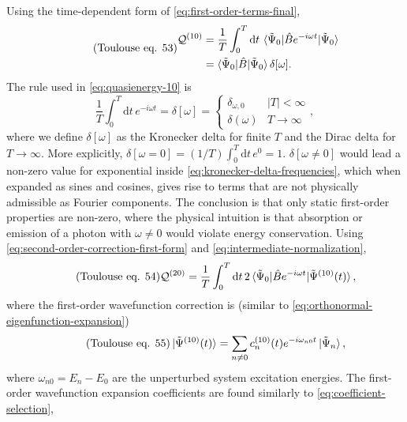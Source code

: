 \documentclass[%
class = book,%
crop = false,%
float = true,%
multi = true,%
preview = false,%
]{standalone}
\begin{document}
Using the time-dependent form of \eqref{eq:first-order-terms-final},
\begin{equation}
  \label{eq:quasienergy-10} \tag{Toulouse eq. 53}
  \begin{aligned}
    \mathcal{Q}^{(10)} &= \frac{1}{T} \int_{0}^{T} \mathrm{d}t \, \braket{\tilde{\Psi}_{0}|\hat{B}e^{-i\omega t}|\tilde{\Psi}_{0}} \\
    &= \braket{\tilde{\Psi}_{0}|\hat{B}|\tilde{\Psi}_{0}} \delta[\omega].
\end{aligned}
\end{equation}
The rule used in \eqref{eq:quasienergy-10} is
\begin{equation}
  \label{eq:kronecker-delta-frequencies}
  \frac{1}{T} \int_{0}^{T} \mathrm{d}t \, e^{-i\omega t} = \delta[\omega] =
  \begin{cases}
    \delta_{\omega,0} & |T| < \infty \\
    \delta(\omega) & T \rightarrow \infty
  \end{cases},
\end{equation}
where we define \(\delta[\omega]\) as the Kronecker delta for finite \(T\) and the Dirac delta for \(T \rightarrow \infty\). More explicitly, \(\delta[\omega = 0] = (1/T) \int_{0}^{T} \mathrm{d}t \, e^{0} = 1\). \(\delta[\omega \neq 0]\) would lead a non-zero value for exponential inside \eqref{eq:kronecker-delta-frequencies}, which when expanded as sines and cosines, gives rise to terms that are not physically admissible as Fourier components. The conclusion is that only static first-order properties are non-zero, where the physical intuition is that absorption or emission of a photon with \(\omega \neq 0\) would violate energy conservation. Using \eqref{eq:second-order-correction-first-form} and \eqref{eq:intermediate-normalization},
\begin{equation}
  \label{eq:quasienergy-20} \tag{Toulouse eq. 54}
  \mathcal{Q}^{(20)} = \frac{1}{T} \int_{0}^{T} \mathrm{d}t \, 2\braket{\tilde{\Psi}_{0}|\hat{B}e^{-i\omega t}|\tilde{\Psi}^{(10)}(t)},
\end{equation}
where the first-order wavefunction correction is (similar to \eqref{eq:orthonormal-eigenfunction-expansion})
\begin{equation}
  \label{eq:first-order-wavefunction-td} \tag{Toulouse eq. 55}
  \ket{\tilde{\Psi}^{(10)}(t)} = \sum_{n\neq 0} c_{n}^{(10)}(t) e^{-i\omega_{n0}t} \ket{\tilde{\Psi}_{n}},
\end{equation}
where \(\omega_{n0} = E_{n} - E_{0}\) are the unperturbed system excitation energies. The first-order wavefunction expansion coefficients are found similarly to \eqref{eq:coefficient-selection},
\end{document}
